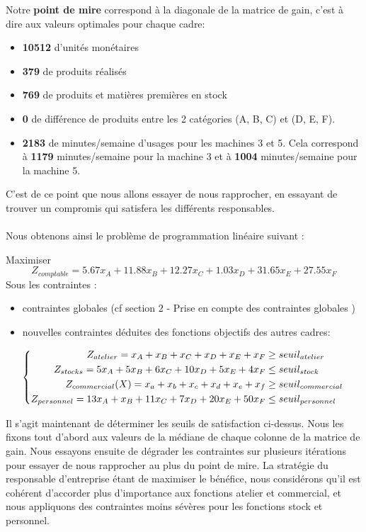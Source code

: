 \documentclass[12pt]{article}
\begin{document}
Notre \textbf{point de mire} correspond à la diagonale de la matrice de gain, c'est à dire aux valeurs optimales pour chaque cadre:
\begin{itemize}
\item \textbf{10512} d'unités monétaires
\item  \textbf{379} de produits réalisés
\item \textbf{769} de produits et matières premières en stock
\item \textbf{0} de différence de produits entre les 2 catégories (A, B, C) et (D, E, F).
\item \textbf{2183} de minutes/semaine d'usages pour les machines 3 et 5. Cela correspond à \textbf{1179} minutes/semaine pour la machine 3 et à \textbf{1004} minutes/semaine pour la machine 5.
\end{itemize}
C'est de ce point que nous allons essayer de nous rapprocher, en essayant de trouver un compromis qui satisfera les différents responsables.
\\ \\
Nous obtenons ainsi le problème de programmation linéaire suivant :
\begin{tcolorbox}
Maximiser
\begin{equation*}
 Z_{comptable}= 5.67x_{A} +11.88x_{B} +12.27x_{C} +1.03x_{D} +31.65x_{E} +27.55x_{F}
\end{equation*}
Sous les contraintes :
\begin{itemize}
\item contraintes globales (cf section 2 - Prise en compte des contraintes globales )
\item nouvelles contraintes déduites des fonctions objectifs des autres cadres:\\
\end{itemize}
\begin{equation*}
\left\{
\begin{aligned}
   Z_{atelier}= x_{A} + x_{B} + x_{C} + x_{D} + x_{E} + x_{F} &\geq seuil_{atelier}
    \\
   Z_{stocks}= 5x_{A} + 5x_{B} + 6x_{C} + 10x_{D} + 5x_{E} + 4x_{F}
   &\leq seuil_{stock}
   \\
   Z_{commercial}(X)=x_{a} + x_{b} + x_{c} + x_{d} + x_{e} + x_{f} &\geq seuil_{commercial}
   \\
   Z_{personnel}= 13x_{A} + x_{B} + 11x_{C} + 7x_{D} + 20x_{E} + 50x_{F}&\leq seuil_{personnel}
\end{aligned}
\right.
\\
\newline
\end{equation*}
\end{tcolorbox}
Il s'agit maintenant de déterminer les seuils de satisfaction ci-dessus. Nous les fixons tout d'abord aux valeurs de la médiane de chaque colonne de la matrice de gain. Nous essayons ensuite de dégrader les contraintes sur plusieurs itérations pour essayer de nous rapprocher au plus du point de mire. La stratégie du responsable d'entreprise étant de maximiser le bénéfice, nous considérons qu'il est cohérent d'accorder plus d'importance aux fonctions atelier et commercial, et nous appliquons des contraintes moins sévères pour les fonctions stock et personnel.
\end{document}
